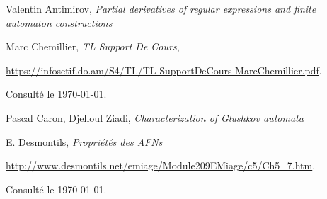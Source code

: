 \begin{enumerate}[label={[\arabic*]}, noitemsep, itemsep=2mm]
  \item Valentin Antimirov, \textit{Partial derivatives of regular expressions 
  and finite automaton constructions}
  \item Marc Chemillier, \textit{TL \- Support De Cours}, 
  
  \href{https://infosetif.do.am/S4/TL/TL-SupportDeCours-MarcChemillier.pdf}
  {https://infosetif.do.am/S4/TL/TL-SupportDeCours-MarcChemillier.pdf}. 
  
  Consulté le \today.
  \item Pascal Caron, Djelloul Ziadi, \textit{Characterization of Glushkov 
  automata}
  \item E. Desmontils, \textit{Propriétés des AFNs}
  
  \href{http://www.desmontils.net/emiage/Module209EMiage/c5/Ch5_7.htm}
  {http://www.desmontils.net/emiage/Module209EMiage/c5/Ch5\_7.htm}.

  Consulté le \today.
\end{enumerate}